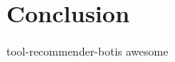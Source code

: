 \documentclass[conference]{IEEEtran}
\newcommand{\tool}{tool-recommender-bot}
\begin{document}
\section{Conclusion}

\tool is awesome




  
%

\end{document}
